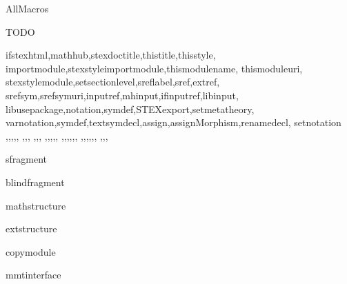 \documentclass{stex}
\begin{document}
  \begin{smodule}{AllMacros}

  \begin{sfragment}{TODO}

    \begin{sfunction}{
      ifstexhtml,mathhub,stexdoctitle,thistitle,thisstyle,
      importmodule,stexstyleimportmodule,thismodulename,
      thismoduleuri,
      stexstylemodule,setsectionlevel,sreflabel,sref,extref,
      srefsym,srefsymuri,inputref,mhinput,ifinputref,libinput,
      libusepackage,notation,symdef,STEXexport,setmetatheory,
      varnotation,symdef,textsymdecl,assign,assignMorphism,renamedecl,
      setnotation
    }{\ifstexhtml,\mathhub,\stexdoctitle,\thistitle,\thisstyle,
    \importmodule,\stexstyleimportmodule,\thismodulename,
    \thismoduleuri,\symdef,\textsymdecl,
    \stexstylemodule,\setsectionlevel,\sreflabel,\sref,\extref,
    \srefsym,\srefsymuri,,\mhinput,\ifinputref,\libinput,
    \libusepackage,\notation,\varnotation,\symdef,\STEXexport,\setmetatheory,
    \assign,\assignMorphism,\renamedecl,\setnotation
    }
    \end{sfunction}

    \begin{senv}{sfragment}\end{senv}
    \begin{senv}{blindfragment}\end{senv}
    \begin{senv}{mathstructure}\end{senv}
    \begin{senv}{extstructure}\end{senv}
    \begin{senv}{copymodule}\end{senv}
    \begin{senv}{mmtinterface}\end{senv}

  \end{sfragment}
  \end{smodule}
\end{document}
